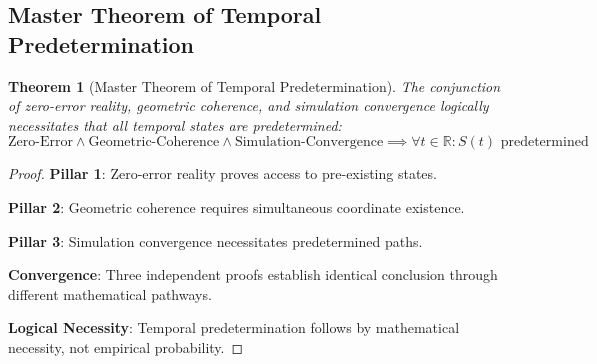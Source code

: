 \documentclass[12pt,a4paper]{article}
\newtheorem{theorem}{Theorem}[section]
\begin{document}
\subsection{Master Theorem of Temporal Predetermination}

\begin{theorem}[Master Theorem of Temporal Predetermination]
The conjunction of zero-error reality, geometric coherence, and simulation convergence logically necessitates that all temporal states are predetermined:
$$\text{Zero-Error} \land \text{Geometric-Coherence} \land \text{Simulation-Convergence} \implies \forall t \in \mathbb{R}: S(t) \text{ predetermined}$$
\end{theorem}

\begin{proof}
\textbf{Pillar 1}: Zero-error reality proves access to pre-existing states.

\textbf{Pillar 2}: Geometric coherence requires simultaneous coordinate existence.

\textbf{Pillar 3}: Simulation convergence necessitates predetermined paths.

\textbf{Convergence}: Three independent proofs establish identical conclusion through different mathematical pathways.

\textbf{Logical Necessity}: Temporal predetermination follows by mathematical necessity, not empirical probability.
\end{proof}
\end{document}
